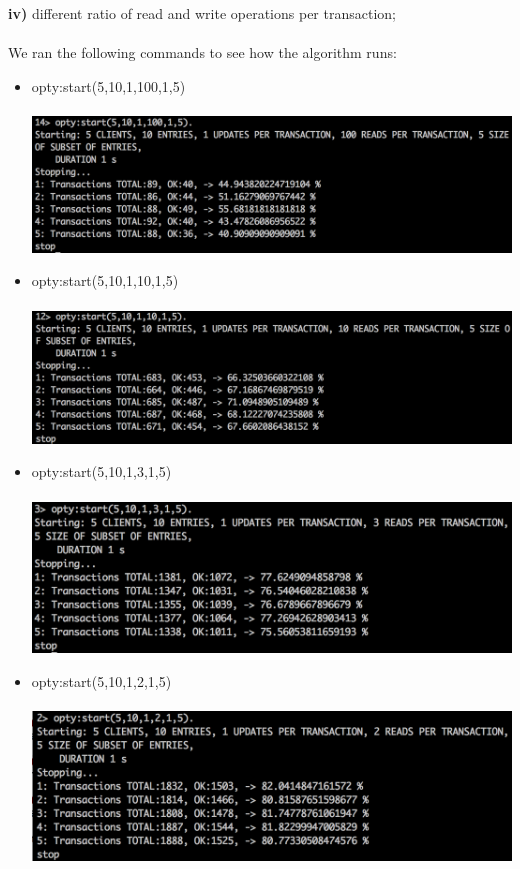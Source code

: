 \documentclass[a4paper, 11pt]{article}
\begin{document}
\textbf{iv)} different ratio of read and write operations per transaction;\\\\
We ran the following commands to see how the algorithm runs:\\
\begin{itemize}
\item opty:start(5,10,1,100,1,5)\\\\
\includegraphics[scale=0.5]{images/exp-iv-7.png} \\
\item opty:start(5,10,1,10,1,5)\\\\
\includegraphics[scale=0.5]{images/exp-iv-5.png} \\
\item opty:start(5,10,1,3,1,5)\\\\
\includegraphics[scale=0.5]{images/exp-iv-3.png} \\
\item opty:start(5,10,1,2,1,5)\\\\
\includegraphics[scale=0.5]{images/exp-iv-1.png} \\

\end{itemize}
\end{document}

